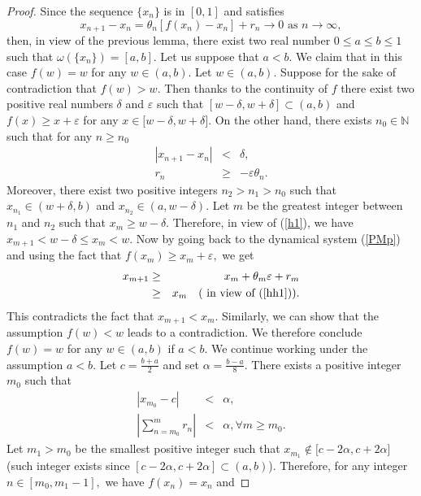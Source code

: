 \documentclass[11pt]{amsart}%
\theoremstyle{plain}
\numberwithin{equation}{section}
\begin{document}
\begin{proof}
Since the sequence $\{x_{n}\}$ is in $[0,1]$ and satisfies
\[
x_{n+1}-x_{n}=\theta _{n}[f(x_{n})-x_{n}]+r_{n}\rightarrow 0\text{ as }%
n\rightarrow \infty ,
\]%
then, in view of the previous lemma, there exist two real number $0\leq a\leq b\leq 1$
such that $\omega (\{x_{n}\})=[a,b].$ Let us suppose that $a<b.$ We claim
that in this case $f(w)=w$ for any $w\in (a,b).$ Let $w\in (a,b).$ Suppose
for the sake of contradiction that $f(w)>w.$ Then thanks to the continuity of $f$ there exist two positive
real numbers $\delta $ and $\varepsilon $ such that $[w-\delta ,w+\delta
]\subset (a,b)$ and $f(x)\geq x+\varepsilon $ for any $x\in \lbrack w-\delta
,w+\delta ].$ On the other hand, there exists $n_{0}\in \mathbb{N}$ such that for any $n\geq
n_{0}$%
\begin{eqnarray}
\left\vert x_{n+1}-x_{n}\right\vert &<&\delta ,  \label{h1} \\
r_{n} &\geq &-\varepsilon \theta _{n}.  \label{hh1}
\end{eqnarray}%
Moreover, there exist two positive integers $n_{2}>n_{1}>n_{0}$ such that $%
x_{n_{1}}\in (w+\delta ,b)$ and $x_{n_{2}}\in (a,w-\delta ).$ Let $m$ be the
greatest integer between $n_{1}$ and $n_{2}$ such that $x_{m}\geq w-\delta .$
Therefore, in view of (\ref{h1}), we have $x_{m+1}<w-\delta \leq x_{m}<w.$
Now by going back to the dynamical system (\ref{PMp}) and using the fact that
$f(x_{m})\geq x_{m}+\varepsilon ,$ we get%
\begin{eqnarray*}
x_{m+1} &\geq &x_{m}+\theta _{m}\varepsilon +r_{m} \\
&\geq &x_{m}~\ \ (\text{ in view of (\ref{hh1})).}
\end{eqnarray*}%
This contradicts the fact that $x_{m+1}<x_{m}.$ Similarly, we can show that
the assumption $f(w)<w$ leads to a contradiction. We therefore conclude $%
f(w)=w$ for any $w\in (a,b)$ if $a<b.$ We continue working under the
assumption $a<b.$ Let $c=\frac{b+a}{2}$ and set $\alpha =\frac{b-a}{8}.$
There exists a positive integer $m_{0}$ such that
\begin{eqnarray}
\left\vert x_{m_{0}}-c\right\vert &<&\alpha ,  \label{h3} \\
\left\vert \sum_{n=m_{0}}^{m}r_{n}\right\vert &<&\alpha ,\forall m\geq m_{0}.
\label{h4}
\end{eqnarray}%
Let $m_{1}>m_{0}$ be the smallest positive integer such that $%
x_{m_{1}}\notin \lbrack c-2\alpha ,c+2\alpha ]$ (such integer exists since $%
[c-2\alpha ,c+2\alpha ]\subset (a,b)$).  Therefore, for any integer $n\in
[m_{0},m_{1}-1],$ we have $f(x_{n})=x_{n}$ and


\end{proof}
\end{document}
